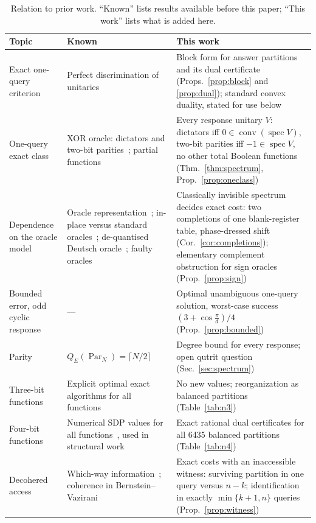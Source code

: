 \documentclass[
  aps,
  pra,
  reprint,
  nofootinbib
]{revtex4-2}
\begin{document}
\begin{table}[t]
\caption{Relation to prior work. ``Known'' lists results available before
this paper; ``This work'' lists what is added here.}
\label{tab:prior}
\begin{ruledtabular}
\begin{tabular}{p{}p{}p{}}
Topic & Known & This work\\
\hline
Exact one-query criterion &
Perfect discrimination of unitaries~\cite{Acin2001UnitaryDiscrimination,DuanFengYing2009} &
Block form for answer partitions and its dual certificate
(Props.~\ref{prop:block} and \ref{prop:dual}); standard convex duality,
stated for use below\\
One-query exact class &
XOR oracle: dictators and two-bit parities~\cite{ChenYeLi2020};
partial functions~\cite{YeLi2020partial} &
Every response unitary \(V\): dictators iff
\(0\in\operatorname{conv}(\operatorname{spec}V)\), two-bit parities iff
\(-1\in\operatorname{spec}V\), no other total Boolean functions
(Thm.~\ref{thm:spectrum},
Prop.~\ref{prop:oneclass})\\
Dependence on the oracle model &
Oracle representation~\cite{WojcikChhajlany2006}; in-place versus standard
oracles~\cite{KashefiKentVedralBanaszek2002}; de-quantised Deutsch
oracle~\cite{Calude2006Dequantising}; faulty
oracles~\cite{RegevSchiff2008} &
Classically invisible spectrum decides exact cost: two completions of one
blank-register table, phase-dressed shift (Cor.~\ref{cor:completions});
elementary complement obstruction for sign oracles (Prop.~\ref{prop:sign})\\
Bounded error, odd cyclic response &
--- &
Optimal unambiguous one-query solution, worst-case success
\((3+\cos\frac{\pi}{d})/4\) (Prop.~\ref{prop:bounded})\\
Parity &
\(Q_E(\operatorname{Par}_N)=\lceil N/2\rceil\)~\cite{bbcmw-01,Farhi-98} &
Degree bound for every response; open qutrit question
(Sec.~\ref{sec:spectrum})\\
Three-bit functions &
Explicit optimal exact algorithms for all
functions~\cite{MontanaroJozsaMitchison2015} &
No new values; reorganization as balanced partitions
(Table~\ref{tab:n3})\\
Four-bit functions &
Numerical SDP values for all functions~\cite{MontanaroJozsaMitchison2015},
used in structural work~\cite{YeYangHuang2024} &
Exact rational dual certificates for all 6435 balanced partitions
(Table~\ref{tab:n4})\\
Decohered access &
Which-way information~\cite{Englert1996}; coherence in
Bernstein--Vazirani~\cite{NaseriEtAl2022} &
Exact costs with an inaccessible witness: surviving partition in one query
versus \(n-k\); identification in exactly \(\min\{k+1,n\}\) queries
(Prop.~\ref{prop:witness})\\
\end{tabular}
\end{ruledtabular}
\end{table}
\end{document}
